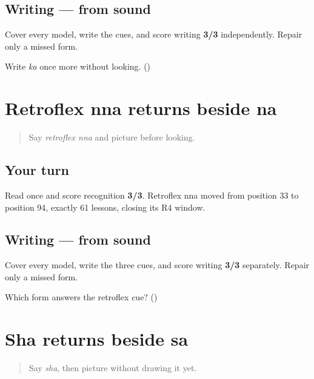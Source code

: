 \subsection*{Writing — from sound}
Cover every model, write the cues, and score writing \textbf{3/3} independently. Repair only a missed form.

\begin{tcolorbox}[breakable,colback=teal!4,colframe=teal!35!black,title={Before you move on}]
Write \emph{ka} once more without looking. (\textbf{})
\end{tcolorbox}
\section[retroflex nna — na]{Retroflex nna returns beside na}

\label{lesson:GU-R15-nna-r4}



\begin{quote}
Say \emph{retroflex nna} and picture \textbf{} before looking.
\end{quote}

\subsection*{Your turn}
Read \textbf{  } once and score recognition \textbf{3/3}. Retroflex nna moved from position 33 to position 94, exactly 61 lessons, closing its R4 window.

\subsection*{Writing — from sound}
Cover every model, write the three cues, and score writing \textbf{3/3} separately. Repair only a missed form.

\begin{tcolorbox}[breakable,colback=teal!4,colframe=teal!35!black,title={Before you move on}]
Which form answers the retroflex cue? (\textbf{})
\end{tcolorbox}
\section[sha — sa]{Sha returns beside sa}

\label{lesson:GU-R15-sha-r4}



\begin{quote}
Say \emph{sha}, then picture \textbf{} without drawing it yet.
\end{quote}

